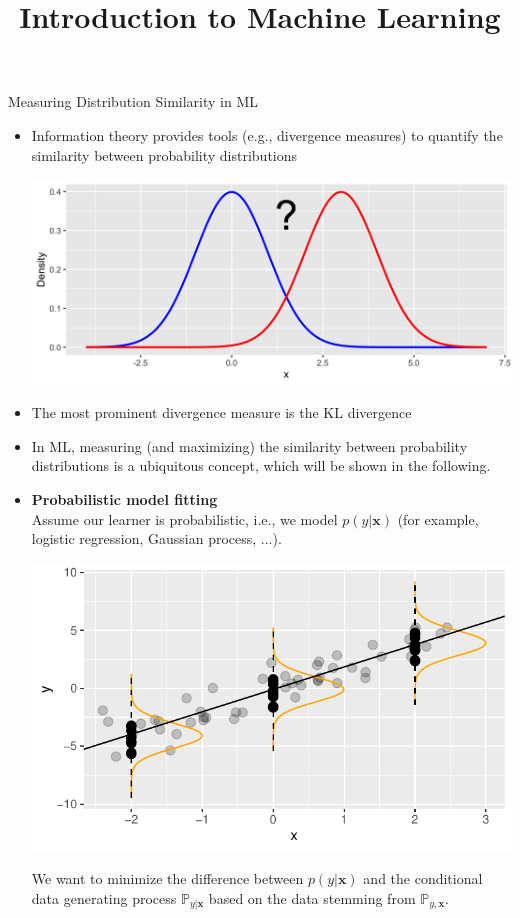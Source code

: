 \documentclass[11pt,compress,t,notes=noshow, xcolor=table]{beamer}
\title{Introduction to Machine Learning}
\date{}
\begin{document}

\begin{vbframe} {Measuring Distribution Similarity in ML}
\begin{itemize}
    \item Information theory provides tools (e.g., divergence measures) to quantify the similarity between probability distributions
    
    \begin{center}
    \includegraphics[width=0.7\linewidth]{figure/normal_distributions.png}
    \end{center}
    
    \item The most prominent divergence measure is the KL divergence 
\item In ML, measuring (and maximizing) the similarity between probability distributions is a ubiquitous concept, which will be shown in the following.
\end{itemize}
\framebreak
\begin{itemize}
    \item \textbf{Probabilistic model fitting}\\
Assume our learner is probabilistic, i.e., we model $p(y| \mathbf{x})$ (for example, logistic regression, Gaussian process, ...).

\begin{center}
\includegraphics[width=0.5\linewidth]{figure/ftrue.pdf}
\end{center}

We want to minimize the difference between $p(y \vert \mathbf{x})$ and the conditional data generating process $\mathbb{P}_{y\vert\mathbf{x}}$ based on the data stemming from $\mathbb{P}_{y, \mathbf{x}}.$


\end{itemize}
\end{vbframe}
\end{document}
